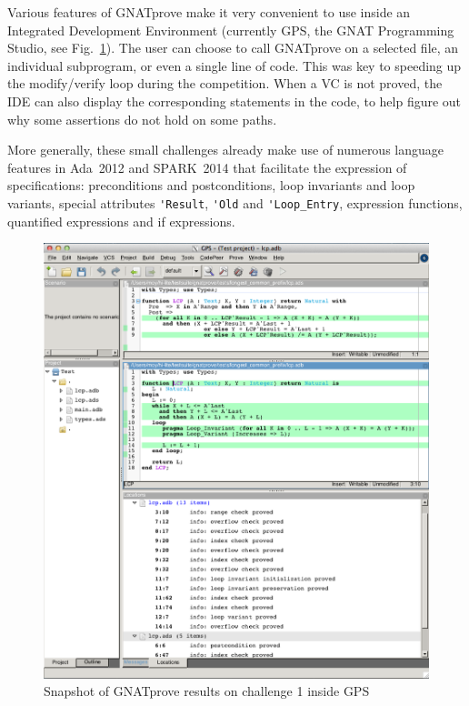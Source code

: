 \documentclass[sttt,final]{svjour}
\newcommand{\gnatprove}{GNATprove\xspace}
\newcommand{\newspark}{SPARK~2014\xspace}
\newcommand{\adatwtw}{Ada~2012\xspace}
\begin{document}
Various features of \gnatprove make it very convenient to use inside
an Integrated Development Environment (currently GPS, the GNAT
Programming Studio, see Fig.~\ref{fig:snapshot}). The user can choose
to call \gnatprove on a selected file, an individual subprogram, or
even a single line of code. This was key to speeding up the
modify/verify loop during the competition. When a VC is not proved,
the IDE can also display the corresponding statements in the code, to
help figure out why some assertions do not hold on some paths.

More generally, these small challenges already make use of numerous
language features in \adatwtw and \newspark that facilitate the
expression of specifications: preconditions and postconditions, loop
invariants and loop variants, special attributes \verb|'Result|,
\verb|'Old| and \verb|'Loop_Entry|, expression functions, quantified
expressions and if expressions.

\begin{figure}
\includegraphics[width=\linewidth]{gnatprove.png}
\caption{Snapshot of GNATprove results on challenge 1 inside GPS}
\label{fig:snapshot}
\end{figure}
\end{document}
